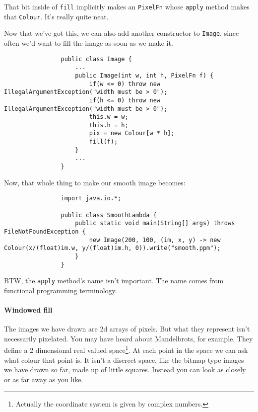\documentclass{article}
\begin{document}
            That bit inside of \texttt{fill} implicitly makes an \texttt{PixelFn} whose \texttt{apply} method makes that \texttt{Colour}.
            It's really quite neat.
            
            Now that we've got this, we can also add another constructor to \texttt{Image}, since often we'd want to fill the image as soon
            as we make it.
            
            \begin{verbatim}
                public class Image {
                    ...
                    public Image(int w, int h, PixelFn f) {
                        if(w <= 0) throw new IllegalArgumentException("width must be > 0");
                        if(h <= 0) throw new IllegalArgumentException("width must be > 0");
                        this.w = w;
                        this.h = h;
                        pix = new Colour[w * h];
                        fill(f);
                    }
                    ...
                }
            \end{verbatim}
            
            Now, that whole thing to make our smooth image becomes:
            
            \begin{verbatim}
                import java.io.*;

                public class SmoothLambda {
                    public static void main(String[] args) throws FileNotFoundException {
                        new Image(200, 100, (im, x, y) -> new Colour(x/(float)im.w, y/(float)im.h, 0)).write("smooth.ppm");
                    }
                }
            \end{verbatim}
        
            BTW, the \texttt{apply} method's name isn't important. The name comes from functional programming terminology.
        
        \newpage
        \paragraph{Windowed fill}
            The images we have drawn are 2d arrays of pixels. But what they represent isn't necessarily pixelated. You may have heard about
            Mandelbrots, for example. They define a 2 dimensional real valued space\footnote{Actually the coordinate system is given by
            complex numbers.}. At each point in the space we can ask what colour that point is. It isn't a discreet space, like the bitmap
            type images we have drawn so far, made up of little squares. Instead you can look as closely or as far away as you like.
            
\end{document}
